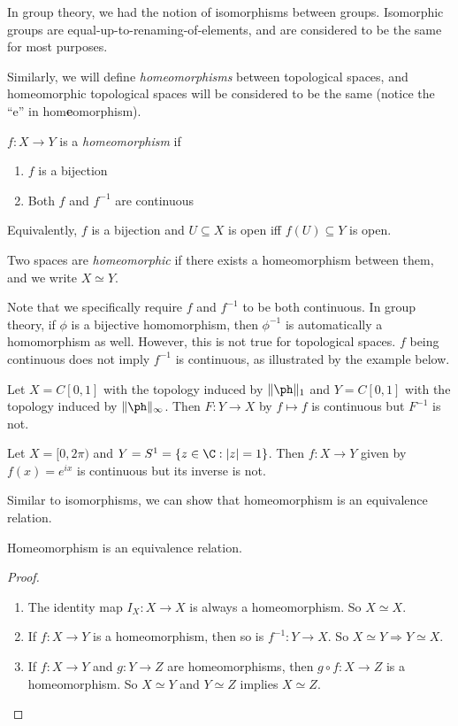 \documentclass[a4paper]{article}
\begin{document}
In group theory, we had the notion of isomorphisms between groups. Isomorphic groups are equal-up-to-renaming-of-elements, and are considered to be the same for most purposes.

Similarly, we will define \emph{homeomorphisms} between topological spaces, and homeomorphic topological spaces will be considered to be the same (notice the ``e'' in hom\textbf{e}omorphism).
\begin{defi}[Homeomorphism]
  $f: X\to Y$ is a \emph{homeomorphism} if
  \begin{enumerate}
    \item $f$ is a bijection
    \item Both $f$ and $f^{-1}$ are continuous
  \end{enumerate}
  Equivalently, $f$ is a bijection and $U\subseteq X$ is open iff $f(U)\subseteq Y$ is open.

  Two spaces are \emph{homeomorphic} if there exists a homeomorphism between them, and we write $X\simeq Y$.
\end{defi}
Note that we specifically require $f$ and $f^{-1}$ to be both continuous. In group theory, if $\phi$ is a bijective homomorphism, then $\phi^{-1}$ is automatically a homomorphism as well. However, this is not true for topological spaces. $f$ being continuous does not imply $f^{-1}$ is continuous, as illustrated by the example below.

\begin{eg}
  Let $X = C[0, 1]$ with the topology induced by $\|\ph \|_1$ and $Y = C[0, 1]$ with the topology induced by $\|\ph\|_\infty$. Then $F: Y\to X$ by $f\mapsto f$ is continuous but $F^{-1}$ is not.
\end{eg}

\begin{eg}
  Let $X = [0, 2\pi)$ and $Y = S^1 = \{z \in \C: |z| = 1\}$. Then $f: X \to Y$ given by $f(x) = e^{ix}$ is continuous but its inverse is not.
\end{eg}

Similar to isomorphisms, we can show that homeomorphism is an equivalence relation.
\begin{lemma}
  Homeomorphism is an equivalence relation.
\end{lemma}

\begin{proof}\leavevmode
  \begin{enumerate}
    \item The identity map $I_X: X\to X$ is always a homeomorphism. So $X\simeq X$.
    \item If $f: X\to Y$ is a homeomorphism, then so is $f^{-1}:Y\to X$. So $X\simeq Y \Rightarrow Y\simeq X$.
    \item If $f: X\to Y$ and $g: Y\to Z$ are homeomorphisms, then $g\circ f: X\to Z$ is a homeomorphism. So $X\simeq Y$ and $Y\simeq Z$ implies $X\simeq Z$.
  \end{enumerate}
\end{proof}
\end{document}
